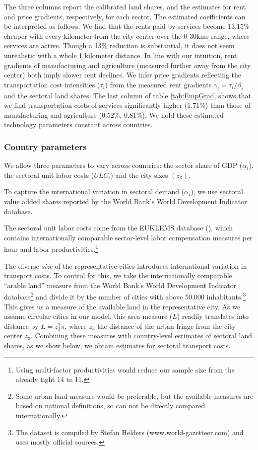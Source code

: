 \documentclass[12pt]{article}
\begin{document}
The three columns report the calibrated land shares, and the estimates for rent and price gradients, respectively, for each sector. The estimated coefficients can be interpreted as follows. We find that the rents paid by services become 13.15\% cheaper with every kilometer from the city center over the 0-30kms range, where services are active. Though a 13\% reduction is substantial, it does not seem unrealistic with a whole 1 kilometer distance. In line with our intuition, rent gradients of manufacturing and agriculture (measured further away from the city center) both imply slower rent declines. We infer price gradients reflecting the transportation cost intensities ($\tau_i$) from the measured rent gradients $\gamma_i=\tau_i/\beta_i$ and the sectoral land shares. The last column of table \ref{tab:EmpGrad} shows that we find transportation costs of services significantly higher (1.71\%) than those of manufacturing and agriculture (0.52\%, 0.81\%). We hold these estimated technology parameters constant across countries. %

\subsubsection{Country parameters}
We allow three parameters to vary across countries: the sector share of GDP ($\alpha_i$), the sectoral unit labor costs ($ULC_i$) and the city sizes $(z_3)$.

To capture the international variation in sectoral demand ($\alpha_i$), we use sectoral value added shares reported by the World Bank's World Development Indicator database.

The sectoral unit labor costs come from the EUKLEMS database (), which contains internationally comparable sector-level labor compensation measures per hour and labor productivities.\footnote{Using multi-factor productivities would reduce our sample size from the already tight 14 to 11.}

The diverse \emph{size} of the representative cities introduces international variation in transport costs. To control for this, we take the internationally comparable ``arable land'' measure from the World Bank's World Development Indicator database\footnote{Some urban land measure would be preferable, but the available measures are based on national definitions, so can not be directly compared internationally.} and divide it by the number of cities with above 50.000 inhabitants.\footnote{The dataset is compiled by Stefan Helders (www.world-gazetteer.com) and uses mostly official sources.} This gives us a measure of the available land in the representative city. As we assume circular cities in our model, this area measure ($L$) readily translates into distance by $L=z_3^2\pi$, where $z_3$ the distance of the urban fringe from the city center $z_3$. Combining these measures with country-level estimates of sectoral land shares, as we show below, we obtain estimates for sectoral transport costs.
\end{document}
